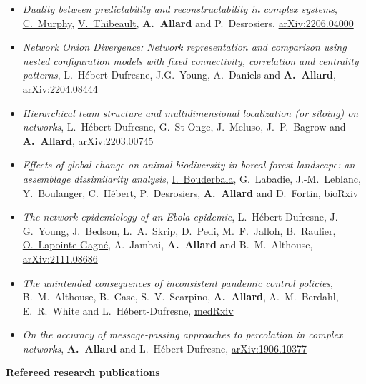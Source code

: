 \documentclass[11pt]{article}
\begin{document}
%
\begin{itemize}[itemsep=0.5em]
%
  \item \textit{Duality between predictability and reconstructability in complex systems}, \uline{C.~Murphy}, \uline{V.~Thibeault}, \textbf{A.~Allard} and P.~Desrosiers, \href{https://arxiv.org/abs/2206.04000}{arXiv:2206.04000}
%
  \item \textit{Network Onion Divergence: Network representation and comparison using nested configuration models with fixed connectivity, correlation and centrality patterns}, L.~Hébert-Dufresne, J.G.~Young, A.~Daniels and \textbf{A.~Allard}, \href{https://arxiv.org/abs/2204.08444}{arXiv:2204.08444}
%
  \item \textit{Hierarchical team structure and multidimensional localization (or siloing) on networks}, L.~Hébert-Dufresne, G.~St-Onge, J.~Meluso, J.~P.~Bagrow and \textbf{A.~Allard}, \href{https://arxiv.org/abs/2203.00745}{arXiv:2203.00745}
%
  \item \textit{Effects of global change on animal biodiversity in boreal forest landscape: an assemblage dissimilarity analysis}, \uline{I.~Bouderbala}, G.~Labadie, J.-M.~Leblanc, Y.~Boulanger, C.~Hébert, P.~Desrosiers, \textbf{A.~Allard} and D.~Fortin, \href{https://doi.org/10.1101/2022.01.31.477297}{bioRxiv}
%
  \item \textit{The network epidemiology of an Ebola epidemic}, L.~Hébert-Dufresne, J.-G.~Young, J.~Bedson, L.~A.~Skrip, D.~Pedi, M.~F.~Jalloh, \uline{B.~Raulier}, \uline{O.~Lapointe-Gagné}, A.~Jambai, \textbf{A.~Allard} and B.~M.~Althouse, \href{https://arxiv.org/abs/2111.08686}{arXiv:2111.08686}
%
  \item \textit{The unintended consequences of inconsistent pandemic control policies}, B.~M.~Althouse, B.~Case, S.~V.~Scarpino, \textbf{A.~Allard}, A.~M.~Berdahl, E.~R.~White and L.~Hébert-Dufresne, \href{https://doi.org/10.1101/2020.08.21.20179473}{medRxiv}
%
  \item \textit{On the accuracy of message-passing approaches to percolation in complex networks}, \textbf{A.~Allard} and L.~H\'ebert-Dufresne, \href{https://arxiv.org/abs/1906.10377}{arXiv:1906.10377}
%
\end{itemize}
%
%
%
\textbf{Refereed research publications}
%
\end{document}
